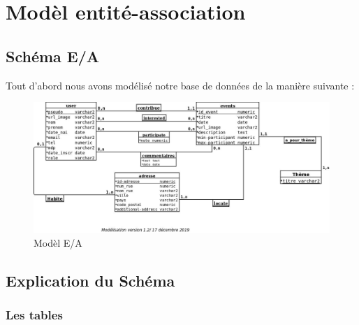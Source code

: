\documentclass[oneside,11pt,a4paper]{article}
\begin{document}
\section{Modèl entité-association}

\subsection{Schéma E/A}

Tout d'abord nous avons modélisé notre base de données de la manière suivante :

\begin{figure}[h]
  \centering
  \includegraphics[width=1\textwidth]{img/modelisation.jpeg}
  \caption{Modèl E/A}
\end{figure}

\subsection{Explication du Schéma}

\subsubsection*{Les tables}
\end{document}
